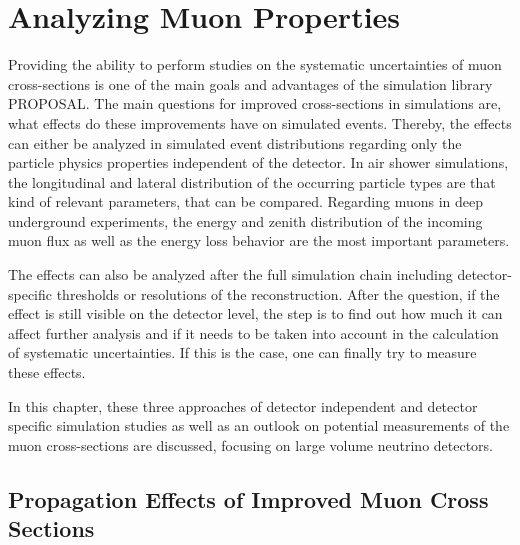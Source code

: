 \chapter{Analyzing Muon Properties} \label{sec:analysis}

Providing the ability to perform studies on the systematic uncertainties of muon cross-sections is one of the main goals and advantages of the simulation library PROPOSAL.
The main questions for improved cross-sections in simulations are, what effects do these improvements have on simulated events.
Thereby, the effects can either be analyzed in simulated event distributions regarding only the particle physics properties independent of the detector.
In air shower simulations, the longitudinal and lateral distribution of the occurring particle types are that kind of relevant parameters, that can be compared.
Regarding muons in deep underground experiments, the energy and zenith distribution of the incoming muon flux as well as the energy loss behavior are the most important parameters.%

The effects can also be analyzed after the full simulation chain including detector-specific thresholds or resolutions of the reconstruction.
After the question, if the effect is still visible on the detector level, the step is to find out how much it can affect further analysis and if it needs to be taken into account in the calculation of systematic uncertainties.
If this is the case, one can finally try to measure these effects.

In this chapter, these three approaches of detector independent and detector specific simulation studies as well as an outlook on potential measurements of the muon cross-sections are discussed, focusing on large volume neutrino detectors.

%

\section{Propagation Effects of Improved Muon Cross Sections}

